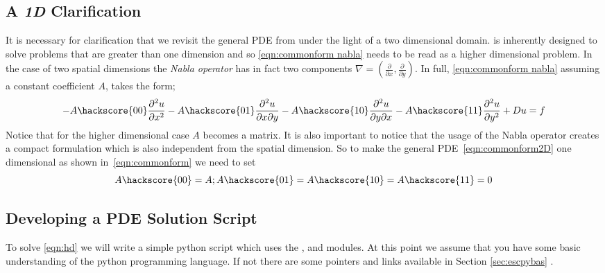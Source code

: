 \subsection{A \textit{1D} Clarification}
It is necessary for clarification that we revisit the general PDE from  under the light of a two dimensional domain. \esc is inherently designed to solve problems that are greater than one dimension and so \ref{eqn:commonform nabla} needs to be read as a higher dimensional problem. In the case of two spatial dimensions the \textit{Nabla operator} has in fact two components $\nabla = (\frac{\partial}{\partial x}, \frac{\partial}{\partial y})$. In full, \ref{eqn:commonform nabla} assuming a constant coefficient $A$, takes the form;
\begin{equation}\label{eqn:commonform2D}
-A\hackscore{00}\frac{\partial^{2}u}{\partial x^{2}} 
-A\hackscore{01}\frac{\partial^{2}u}{\partial x\partial y} 
-A\hackscore{10}\frac{\partial^{2}u}{\partial y\partial x} 
-A\hackscore{11}\frac{\partial^{2}u}{\partial y^{2}} 
+ Du = f
\end{equation}
Notice that for the higher dimensional case $A$ becomes a matrix. It is also
important to notice that the usage of the Nabla operator creates
a compact formulation which is also independent from the spatial dimension. 
So to make the general PDE~\ref{eqn:commonform2D} one dimensional as
shown in~\ref{eqn:commonform} we need to set
\begin{equation}
A\hackscore{00}=A; A\hackscore{01}=A\hackscore{10}=A\hackscore{11}=0
\end{equation}

\subsection{Developing a PDE Solution Script}
To solve \ref{eqn:hd} we will write a simple python script which uses the \modescript, \modfinley and \modmpl modules. At this point we assume that you have some basic understanding of the python programming language. If not there are some pointers and links available in Section \ref{sec:escpybas} .

